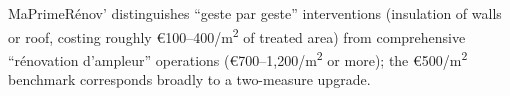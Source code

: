 MaPrimeR\'enov' distinguishes ``geste par geste'' interventions (insulation of walls or roof, costing roughly \euro{}100--400/m\textsuperscript{2} of treated area) from comprehensive ``r\'enovation d'ampleur'' operations (\euro{}700--1{,}200/m\textsuperscript{2} or more); the \euro{}500/m\textsuperscript{2} benchmark corresponds broadly to a two-measure upgrade.